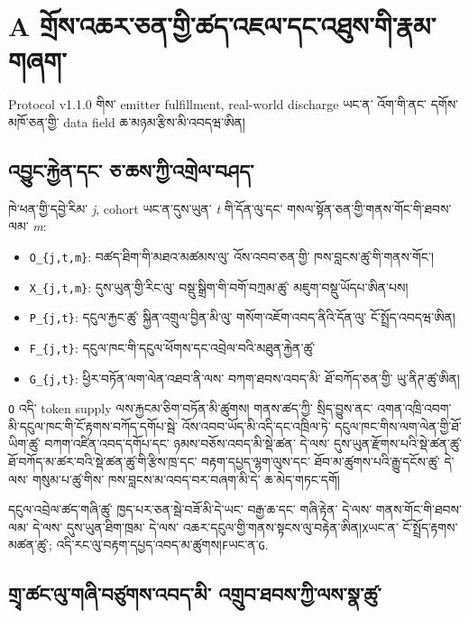 \documentclass[11pt]{article}
\begin{document}
\section*{A གྲོས་འཆར་ཅན་གྱི་ཚད་འཇལ་དང་འཐུས་གི་རྣམ་གཞག་}

Protocol v1.1.0 གིས་ emitter fulfillment, real-world discharge ཡང་ན་ འོག་གི་ནང་ དགོས་མཁོ་ཅན་གྱི་ data field ཆ་མཉམ་རྩིས་མི་འབདཝ་ཨིན།

\subsection*{འབྱུང་རྐྱེན་དང་ ཅ་ཆས་ཀྱི་འགྲེལ་བཤད་}

ཁེ་ཕན་གྱི་དབྱེ་རིམ་ \emph{j}, cohort ཡང་ན་དུས་ཡུན་ \emph{t} གི་དོན་ལུ་དང་ གསལ་སྟོན་ཅན་གྱི་གནས་གོང་གི་ཐབས་ལམ་ \emph{m}:

\begin{itemize}[leftmargin=*]
\item \texttt{O\_\{j,t,m\}}: བཚད་ཐིག་གི་མཐའ་མཚམས་ལུ་ འོས་འབབ་ཅན་གྱི་ ཁས་བླངས་ཚུ་གི་གནས་གོང་།
\item \texttt{X\_\{j,t,m\}}: དུས་ཡུན་གྱི་རིང་ལུ་ བསྡུ་སྒྲིག་གི་བགོ་བཀྲམ་ཚུ་ མཇུག་བསྡུ་ཡོདཔ་ཨིན་པས།
\item \texttt{P\_\{j,t\}}: དངུལ་རྐྱང་ཚུ་ སྐྱིན་འགྲུལ་བྱིན་མི་ལུ་ གསོག་འཇོག་འབད་ནིའི་དོན་ལུ་ ངོ་སྤྲོད་འབདཝ་ཨིན།
\item \texttt{F\_\{j,t\}}: དངུལ་ཁང་གི་དངུལ་ཕོགས་དང་འབྲེལ་བའི་མཐུན་རྐྱེན་ཚུ་
\item \texttt{G\_\{j,t\}}: ཕྱིར་བཏོན་ལག་ལེན་འཐབ་ནི་ལས་ བཀག་ཐབས་འབད་མི་ ཐོ་བཀོད་ཅན་གྱི་ ཡུ་ནིཊ་ཚུ་ཨིན།
\end{itemize}
\texttt{O} འདི་ token supply ལས་རྐྱངམ་ཅིག་བཏོན་མི་ཚུགས། གནས་ཚད་ཀྱི་ སྲིད་བྱུས་ནང་ འགན་འཁྲི་འབག་མི་དངུལ་ཁང་གི་ངོ་རྟགས་བཀོད་དགོཔ་སྦེ་ འོས་འབབ་ཡོད་མི་འདི་དང་འཁྲིལ་ཏེ་ དངུལ་ཁང་གིས་ལག་ལེན་གྱི་ཐོ་ཡིག་ཚུ་ བཀག་འཛིན་འབད་དགོཔ་དང་ ཉམས་བཅོས་འབད་མི་སྡེ་ཚན་ དེ་ལས་ དུས་ཡུན་རྫོགས་པའི་སྡེ་ཚན་ཚུ་ ཐོ་བཀོད་མ་ཚར་བའི་སྡེ་ཚན་ཚུ་གི་རྩིས་ཁྲ་དང་ བརྟག་དཔྱད་ལྷག་ལུས་དང་ ཐོབ་མ་ཚུགས་པའི་རྒྱུ་དངོས་ཚུ་ དེ་ལས་ གསུམ་པ་ཚུ་གིས་ ཁས་བླངས་མ་འབད་བར་བཞག་མི་དེ་ ཆ་མེད་གཏང་དགོ།

དངུལ་འབྲེལ་ཚད་གཞི་ཚུ་ ཁྱད་པར་ཅན་སྦེ་བཟོ་མི་དེ་ཡང་ བརྒྱ་ཆ་དང་ གཞི་རྟེན་ དེ་ལས་ གནས་གོང་གི་ཐབས་ལམ་ དེ་ལས་ དུས་ཡུན་ཐིག་ཁྲམ་ དེ་ལས་ འཆར་དངུལ་གྱི་གནས་སྟངས་ལུ་བརྟེན་ཨིན།\texttt{X}ཡང་ན་ ངོ་སྤྲོད་རྟགས་མཚན་ཚུ་; འདི་རང་ལུ་བརྟག་དཔྱད་འབད་མ་ཚུགས།\texttt{F}ཡང་ན་\texttt{G}.

\subsection*{གྲྭ་ཚང་ལུ་གཞི་བཙུགས་འབད་མི་ འགྲུབ་ཐབས་ཀྱི་ལས་སྣ་ཚུ་}
\end{document}
